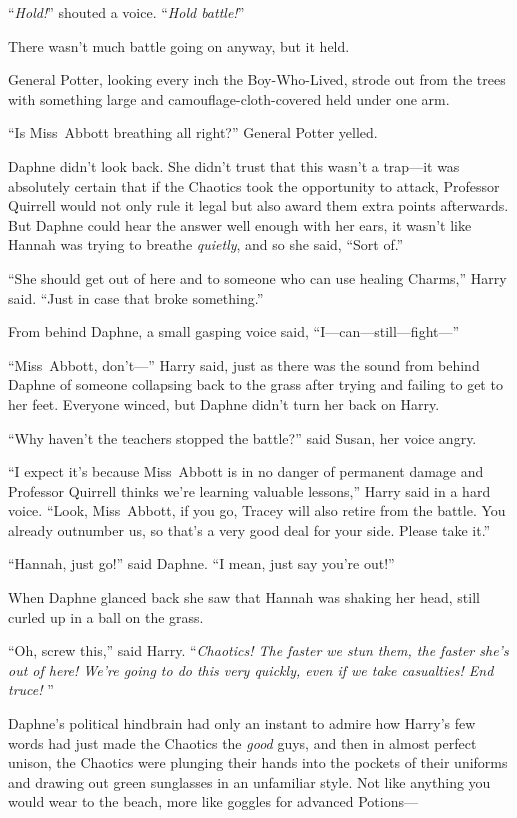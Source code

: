 “\emph{Hold!}” shouted a voice. “\emph{Hold battle!}”

There wasn’t much battle going on anyway, but it held.

General Potter, looking every inch the Boy-Who-Lived, strode out from the trees with something large and camouflage-cloth-covered held under one arm.

“Is Miss~Abbott breathing all right?” General Potter yelled.

Daphne didn’t look back. She didn’t trust that this wasn’t a trap—it was absolutely certain that if the Chaotics took the opportunity to attack, Professor Quirrell would not only rule it legal but also award them extra points afterwards. But Daphne could hear the answer well enough with her ears, it wasn’t like Hannah was trying to breathe \emph{quietly}, and so she said, “Sort of.”

“She should get out of here and to someone who can use healing Charms,” Harry said. “Just in case that broke something.”

From behind Daphne, a small gasping voice said, “I—can—still—fight—”

“Miss~Abbott, don’t—” Harry said, just as there was the sound from behind Daphne of someone collapsing back to the grass after trying and failing to get to her feet. Everyone winced, but Daphne didn’t turn her back on Harry.

“Why haven’t the teachers stopped the battle?” said Susan, her voice angry.

“I expect it’s because Miss~Abbott is in no danger of permanent damage and Professor Quirrell thinks we’re learning valuable lessons,” Harry said in a hard voice. “Look, Miss~Abbott, if you go, Tracey will also retire from the battle. You already outnumber us, so that’s a very good deal for your side. Please take it.”

“Hannah, just go!” said Daphne. “I mean, just say you’re out!”

When Daphne glanced back she saw that Hannah was shaking her head, still curled up in a ball on the grass.

“Oh, screw this,” said Harry. “\emph{Chaotics! The faster we stun them, the faster she’s out of here! We’re going to do this very quickly, even if we take casualties! End truce! }”

Daphne’s political hindbrain had only an instant to admire how Harry’s few words had just made the Chaotics the \emph{good} guys, and then in almost perfect unison, the Chaotics were plunging their hands into the pockets of their uniforms and drawing out green sunglasses in an unfamiliar style. Not like anything you would wear to the beach, more like goggles for advanced Potions—

